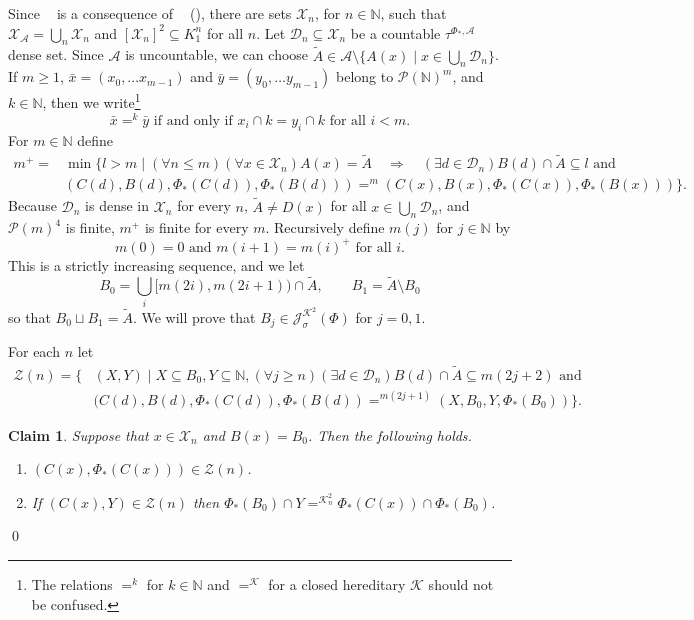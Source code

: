 \documentclass{amsart}
\makeatletter
\def\X{{\mathcal X}}
\def\text{\mbox}
\newtheorem{claim}{Claim}
\theoremstyle{definition}
\theoremstyle{remark}
\newcommand{\Jsigma}{\cJ_\sigma}
\newcommand{\cK}{{\mathcal K}}
\renewcommand{\proofname}{Proof}
\renewenvironment{proof}[1][\proofname]{\par
\let\oldqedsymbol\qedsymbol             %
  \normalfont
  \topsep6\p@\@plus6\p@ \trivlist
  \item[\hskip\labelsep\hskip\parindent\scshape
    #1\@addpunct{.}]\ignorespaces
}{%
  \qed\endtrivlist
\global\let\qedsymbol\oldqedsymbol      %
}
\newcommand{\cP}{\mathcal P}
\newcommand{\bbN}{\mathbb N}
\newcommand{\cJ}{{\mathcal J}} %
\newcommand{\cA}{\mathcal A}
\newcommand{\cX}{\mathcal X}
\newcommand{\cZ}{\mathcal Z}
\DeclareMathOperator{\OCAT}{OCA_T}
\DeclareMathOperator{\OCAinfty}{OCA_\infty}
\newcommand{\calD}{{\mathcal D}}
\newcommand{\cPN}{\cP(\bbN)}
\numberwithin{claim}{subsection}
\makeatother
\begin{document}
\begin{proof}
Since $\OCAinfty$ is a consequence of $\OCAT$ (\cite[\S 5]{moore2021some}), there are sets $\cX_n$, for $n\in \bbN$, such that $\cX_\cA=\bigcup_n \cX_n$ and $[\cX_n]^2\subseteq K^n_1$ for all $n$.  Let $\calD_n\subseteq \cX_n$ be a countable $\tau^{\Phi_*,\cA}$ dense set. Since $\cA$ is uncountable, we can choose $\tilde A \in \cA\setminus \{A(x)\mid x\in \bigcup_n \calD_n\}$. 
If $m\geq 1$, $\bar x=(x_0,\dots x_{m-1})$ and $\bar y=(y_0,\dots y_{m-1})$ belong to $\cPN^m$,  and $k\in \bbN$, then we write\footnote{The relations $=^k$ for $k\in \bbN$ and $=^{\cK}$ for a closed hereditary $\cK$ should not be confused.}  
\[
\bar x=^k \bar y\text{ if and only if $x_i\cap k=y_i\cap k$ for all $i<m$.}
\]
For $m\in \bbN$ define 
\begin{align*}
m^+=&\min\{l>m\mid (\forall n\leq m) (\forall x\in \cX_n)A(x)=\tilde A\quad\Rightarrow \quad(\exists d\in \calD_n) B(d)\cap \tilde A\subseteq l\text { and}\\
&
(C(d), B(d), \Phi_*(C(d)), \Phi_*(B(d)))=^{m} 
(C(x), B(x), \Phi_*(C(x)), \Phi_*(B(x)))
\}. 
\end{align*}
Because $\calD_n$ is dense in $\X_n$ for every $n$, $\tilde A\neq D(x)$ for all $x\in \bigcup_n \calD_n$, and $\cP(m)^4$ is finite, 
 $m^+$ is finite for every $m$. 
Recursively define $m(j)$ for $j\in \bbN$ by 
\[
m(0)=0\text{ and }m(i+1)=m(i)^+\text{ for all $i$}.
\] 
This is a strictly increasing sequence, 
and  we let  
\[
B_0=\bigcup_i [m(2i), m(2i+1))\cap \tilde A, \qquad B_1=\tilde A\setminus B_0 
\]
so that $B_0\sqcup B_1=\tilde A$. 
We will prove that $B_j\in\Jsigma^{\cK^2}(\Phi)$ for $j=0,1$. 

For each $n$ let 
\begin{align*}
\cZ(n)=\{&(X,Y)\mid X\subseteq B_0, Y\subseteq \bbN, (\forall j\geq n) (\exists d\in \calD_n) B(d)\cap \tilde A\subseteq m(2j+2)\text{ and } \\
&(C(d), B(d), \Phi_*(C(d)), \Phi_*(B(d))=^{m(2j+1)} 
(X, B_0, Y, \Phi_*(B_0))\}.
\end{align*}

\begin{claim}\label{C.Zn}
	Suppose that $x\in \cX_n$ and $B(x)=B_0$. Then the following holds. 
	\begin{enumerate}
		\item $(C(x),\Phi_*(C(x)))\in \cZ(n)$. 
		\item If $(C(x),Y)\in \cZ(n)$ then $\Phi_*(B_0)\cap Y=^{\cK_n^2} \Phi_*(C(x))\cap \Phi_*(B_0)$. 
	\end{enumerate}
		\end{claim}


\end{proof}
\end{document}
